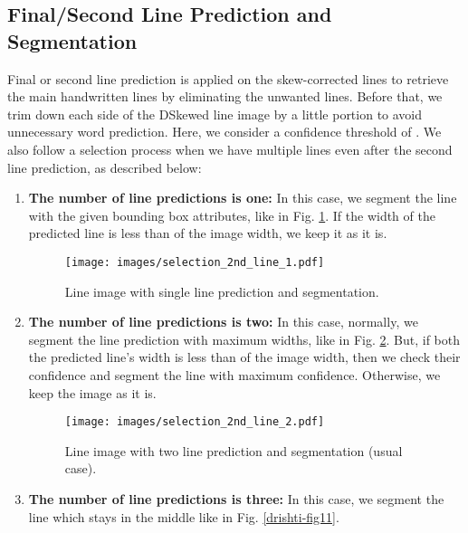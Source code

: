 \documentclass[runningheads]{llncs}
\begin{document}
\subsection{Final/Second Line Prediction and Segmentation}
\label{sec_4_4}
Final or second line prediction is applied on the skew-corrected lines to retrieve the main handwritten lines by eliminating the unwanted lines. Before that, we trim down each side of the DSkewed line image by a little portion to avoid unnecessary word prediction. Here, we consider a confidence threshold of . We also follow a selection process when we have multiple lines even after the second line prediction, as described below:

\begin{enumerate}
  \item \textbf{The number of line predictions is one:} In this case, we segment the line with the given bounding box attributes, like in Fig. \ref{drishti-fig9}. If the width of the predicted line is less than  of the image width, we keep it as it is.
  
    \begin{figure}[h]
\centering    
        \texttt{[image: images/selection\_2nd\_line\_1.pdf]}
        \vspace{-4mm}
        \caption{Line image with single line prediction and segmentation.} 
        \label{drishti-fig9}
        \vspace{-4mm}
    \end{figure}
    
  \item \textbf{The number of line predictions is two:} In this case, normally, we segment the line prediction with maximum widths, like in Fig. \ref{drishti-fig10}. But, if both the predicted line's width is less than  of the image width, then we check their confidence and segment the line with maximum confidence. Otherwise, we keep the image as it is.
  
  \begin{figure}[h]
  \vspace{-4mm}
    \centering    \texttt{[image: images/selection\_2nd\_line\_2.pdf]}
    \vspace{-4mm}
    \caption{Line image with two line prediction and segmentation (usual case).} 
    \label{drishti-fig10}
    \vspace{-4mm}
  \end{figure}
  
  \item \textbf{The number of line predictions is three:} In this case, we segment the line which stays in the middle like in Fig. \ref{drishti-fig11}.


\end{enumerate}
\end{document}
